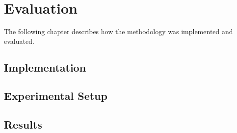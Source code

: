 \chapter{Evaluation}
The following chapter describes how the methodology was implemented and evaluated. 


\section{Implementation}
\section{Experimental Setup}
\section{Results}